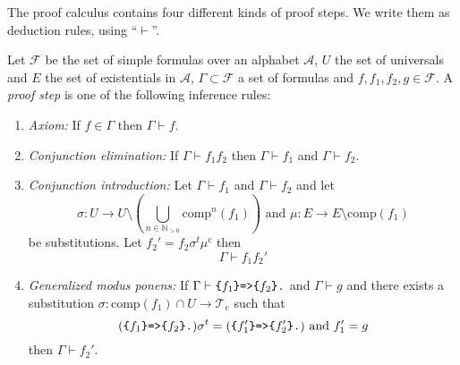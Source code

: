 The \nthree proof calculus contains four different kinds of proof steps. We write them as deduction rules, using ``$\vdash$''.

\begin{definition}\label{proofsteps}
Let $\mathcal{F}$ be the set of simple formulas over an \nthree alphabet $\mathcal{A}$, $U$ the set of universals and $E$ the set of existentials in $\mathcal{A}$,  $\Gamma\subset \mathcal{F}$ a set of formulas and
$f,f_1,f_2, g\in \mathcal{F}$. 
A \textit{proof step} is one of the following inference rules:
\begin{enumerate}
 \item \emph{Axiom:} If $f \in \Gamma$ then $\Gamma \vdash f$.%
 \item \emph{Conjunction elimination:} If $\Gamma \vdash f_1f_2$ then $\Gamma \vdash f_1$ and $\Gamma \vdash f_2$.
 \item \emph{Conjunction introduction:} Let $\Gamma\vdash f_1$ and $\Gamma \vdash f_2$ and 
 let \[\sigma: U\rightarrow U\setminus (\bigcup_{n\in \mathbb{N}_{>0}}\text{comp}^n(f_1) )  %
 \text{ and } %
 \mu:E\rightarrow E\setminus \text{comp}(f_1)\] be substitutions. Let $f_2'= f_2\sigma^t\mu^c$ 
then \[\Gamma \vdash f_1f_2'\]
 \item \emph{Generalized modus ponens:} If $\Gamma \vdash \verb!{!f_1\verb!}=>{!f_2\verb!}.!$ and $\Gamma \vdash g$ %
 and there exists a substitution $\sigma:\text{comp}(f_1)\cap U \rightarrow \mathcal{T}_e$ such that 
 \[
  (\verb!{!f_1\verb!}=>{!f_2\verb!}.!)\sigma^t= (\verb!{!f_1'\verb!}=>{!f_2'\verb!}.!)\text{ and }
 f'_1=g\] 
then $\Gamma \vdash f_2'$.
 \end{enumerate}
\end{definition}

